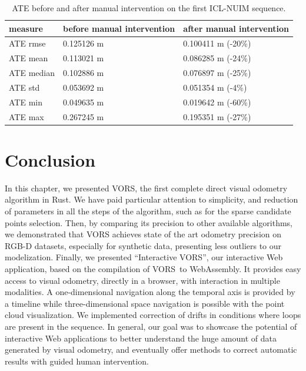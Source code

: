 \begin{table}[ht]
\centering
\begin{tabular}{lll}
measure & before manual intervention & after manual intervention \\
\midrule
	ATE rmse   & 0.125126 m & 0.100411 m (-20\%)\\
	ATE mean   & 0.113021 m & 0.086285 m (-24\%)\\
	ATE median & 0.102886 m & 0.076897 m (-25\%)\\
	ATE std    & 0.053692 m & 0.051354 m (-4\%)\\
	ATE min    & 0.049635 m & 0.019642 m (-60\%)\\
	ATE max    & 0.267245 m & 0.195351 m (-27\%)\\
\end{tabular}%
\caption{ATE before and after manual intervention
	on the first ICL-NUIM sequence.}%
\label{tab:ate-comparison}
\end{table}

\section{Conclusion}%
\label{sec:vors-ccl}

In this chapter, we presented VORS,
the first complete direct visual odometry algorithm in Rust.
We have paid particular attention to simplicity,
and reduction of parameters in all the steps of the algorithm,
such as for the sparse candidate points selection.
Then, by comparing its precision to other available algorithms,
we demonstrated that VORS achieves state of the art odometry precision on RGB-D datasets,
especially for synthetic data, presenting less outliers to our modelization.
Finally, we presented ``Interactive VORS'',
our interactive Web application, based on the compilation of VORS to WebAssembly.
It provides easy access to visual odometry, directly in a browser,
with interaction in multiple modalities.
A one-dimensional navigation along the temporal axis is provided by a timeline
while three-dimensional space navigation is possible with the point cloud visualization.
We implemented correction of drifts in conditions where loops are present in the sequence.
In general, our goal was to showcase the potential of interactive Web applications
to better understand the huge amount of data generated by visual odometry,
and eventually offer methods to correct automatic results with guided human intervention.
